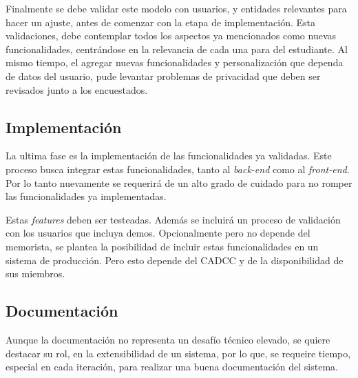 \documentclass[guia]{upropuesta}
\begin{document}
    \par Finalmente se debe validar este modelo con usuarios, y entidades relevantes para hacer un ajuste, antes de comenzar con la etapa de implementación. Esta validaciones, debe contemplar todos los aspectos ya mencionados como nuevas funcionalidades, centrándose en la relevancia de cada una para del estudiante. Al mismo tiempo, el agregar nuevas funcionalidades y personalización que dependa de datos del usuario, pude levantar problemas de privacidad que deben ser revisados junto a los encuestados.
    \subsection{Implementación}
    \par La ultima fase es la implementación de las funcionalidades ya validadas. Este proceso busca integrar estas funcionalidades, tanto al \textit{back-end} como al \textit{front-end}. Por lo tanto nuevamente se requerirá de un alto grado de cuidado para no romper las funcionalidades ya implementadas.
    \par Estas \textit{features} deben ser testeadas. Además se incluirá un proceso de validación con los usuarios que incluya demos. Opcionalmente pero no depende del memorista, se plantea la posibilidad de incluir estas funcionalidades en un sistema de producción. Pero esto depende del CADCC y de la disponibilidad de sus miembros.
    \subsection{Documentación}
    \par Aunque la documentación no representa un desafío técnico elevado, se quiere destacar su rol, en la extensibilidad de un sistema, por lo que, se requeire tiempo, especial en cada iteración, para realizar una buena documentación del sistema.
    
\end{document}
